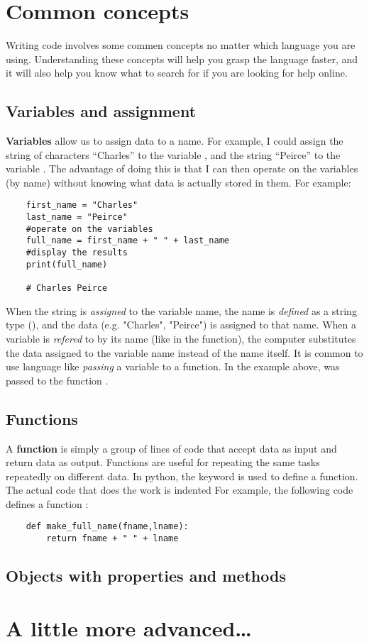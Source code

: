 \section{Common concepts}

Writing code involves some commen concepts no matter which language you are using. Understanding these concepts will help you grasp the language faster, and it will also help you know what to search for if you are looking for help online.

\subsection{Variables and assignment}

\textbf{Variables} allow us to assign data to a name. For example, I could assign the string of characters ``Charles'' to the variable , and the string ``Peirce'' to the variable . The advantage of doing this is that I can then operate on the variables (by name) without knowing what data is actually stored in them. For example:

\begin{verbatim}
    first_name = "Charles"
    last_name = "Peirce"
    #operate on the variables
    full_name = first_name + " " + last_name
    #display the results
    print(full_name)

    # Charles Peirce
\end{verbatim}

When the string is \textit{assigned} to the variable name, the name is \textit{defined} as a string type (), and the data (e.g. "Charles", "Peirce") is assigned to that name. When a variable is \textit{refered} to by its name (like in the  function), the computer substitutes the data assigned to the variable name instead of the name itself. It is common to use language like \textit{passing} a variable to a function. In the example above,  was passed to the function .

\subsection{Functions}

A \textbf{function} is simply a group of lines of code that accept data as input and return data as output. Functions are useful for repeating the same tasks repeatedly on different data. In python, the  keyword is used to define a function. The actual code that does the work is indented For example, the following code defines a function :

\begin{verbatim}
    def make_full_name(fname,lname):
        return fname + " " + lname
\end{verbatim}

\subsection{Objects with properties and methods}

\section{A little more advanced\ldots}

